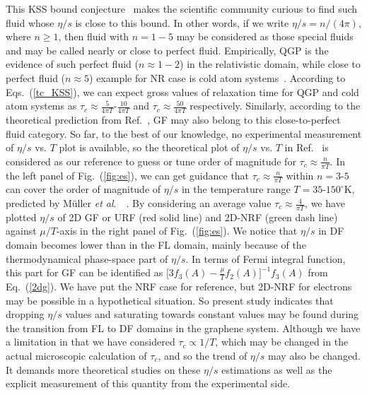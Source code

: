 \documentclass[%
 reprint,
 amsmath,amssymb,
 aps,
]{revtex4-2}
\begin{document}
%
    This KSS bound conjecture~\cite{25Kovtun:2004de} makes the scientific community curious to find such fluid whose $\eta/s$ is close to this bound. In other words, if we write $\eta/s=n/(4\pi)$, where $n\geq 1$, then fluid with $n=1-5$ may be considered as those special fluids and may be called nearly or close to perfect fluid. Empirically, QGP is the evidence of such perfect fluid ($n\approx 1-2$) in the relativistic domain, while close to perfect fluid ($n\approx 5$) example for NR case is cold atom systems~\cite{27Sch_fer_2009}. According to Eqs.~(\ref{tc_KSS}), we can expect gross values of relaxation time for QGP and cold atom systems as $\tau_c\approx\frac{5}{4\pi T}$-$\frac{10}{4\pi T}$ and $\tau_c\approx\frac{50}{4\pi T}$ respectively. 
    Similarly, according to the theoretical prediction from Ref.~\cite{24PhysRevLett.103.025301}, GF may also belong to this close-to-perfect fluid category. So far, to the best of our knowledge, no experimental measurement of $\eta/s$ vs. $T$ plot is available, so the theoretical plot of $\eta/s$ vs. $T$ in Ref.~\cite{24PhysRevLett.103.025301} is considered as our reference to guess or tune order of magnitude for $\tau_c\approx\frac{n}{\pi T}$. 
%    
    In the left panel of Fig.~(\ref{fig:es}), we can get guidance that $\tau_c\approx\frac{n}{\pi T}$ within $n=3$-$5$ can cover the order of magnitude of $\eta/s$ in the temperature range $T=35$-$150^\circ$K, predicted by Müller {\it et al}.~~\cite{24PhysRevLett.103.025301}. By considering an average value $\tau_c\approx\frac{4}{\pi T}$, we have plotted $\eta/s$ of 2D GF or URF (red solid line) and 2D-NRF (green dash line) against $\mu/T$-axis in the right panel of Fig.~(\ref{fig:es}).
    We notice that $\eta/s$ in DF domain becomes lower than in the FL domain, mainly because of the thermodynamical phase-space part of $\eta/s$. In terms of Fermi integral function, this part for GF can be identified as $\Big[3f_3\left(A\right) - \frac{\mu}{T} f_2\left(A\right) \Big]^{-1} f_3\left(A\right)$ from Eq.~(\ref{2dg}).
    We have put the NRF case for reference, but 2D-NRF for electrons may be possible in a hypothetical situation. So present study indicates that dropping $\eta/s$ values and saturating towards constant values may be found during the transition from FL to DF domains in the graphene system.
    Although we have a limitation in that we have considered $\tau_c\propto 1/T$, which may be changed in the actual microscopic calculation of $\tau_c$, and so the trend of $\eta/s$ may also be changed. It demands more theoretical studies on these $\eta/s$ estimations as well as the explicit measurement of this quantity from the experimental side.
%    
%    
\end{document}

